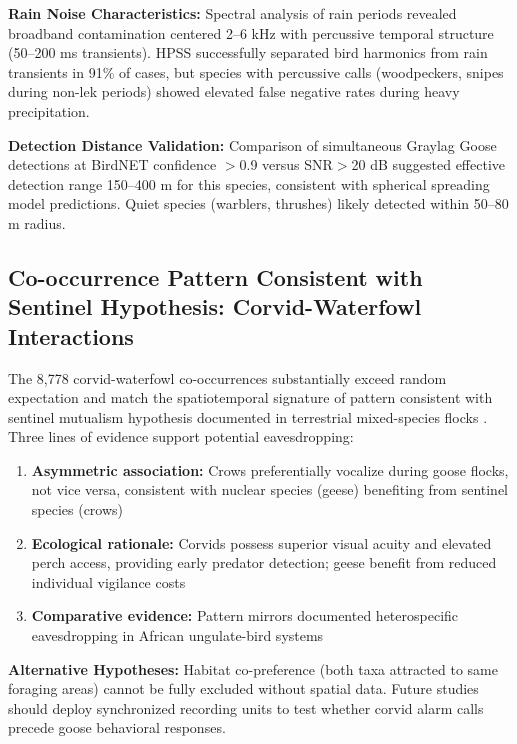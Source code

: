 \documentclass[twocolumn]{article}
\begin{document}
\textbf{Rain Noise Characteristics:} Spectral analysis of rain periods revealed broadband contamination centered 2--6 kHz with percussive temporal structure (50--200 ms transients). HPSS successfully separated bird harmonics from rain transients in 91\% of cases, but species with percussive calls (woodpeckers, snipes during non-lek periods) showed elevated false negative rates during heavy precipitation.

\textbf{Detection Distance Validation:} Comparison of simultaneous Graylag Goose detections at BirdNET confidence $>$0.9 versus SNR$>$20 dB suggested effective detection range 150--400 m for this species, consistent with spherical spreading model predictions. Quiet species (warblers, thrushes) likely detected within 50--80 m radius.

\subsection{Co-occurrence Pattern Consistent with Sentinel Hypothesis: Corvid-Waterfowl Interactions}

The 8,778 corvid-waterfowl co-occurrences substantially exceed random expectation and match the spatiotemporal signature of pattern consistent with sentinel mutualism hypothesis documented in terrestrial mixed-species flocks \citep{Magrath2015}. Three lines of evidence support potential eavesdropping:

\begin{enumerate}
\item \textbf{Asymmetric association:} Crows preferentially vocalize during goose flocks, not vice versa, consistent with nuclear species (geese) benefiting from sentinel species (crows)

\item \textbf{Ecological rationale:} Corvids possess superior visual acuity and elevated perch access, providing early predator detection; geese benefit from reduced individual vigilance costs \citep{King2023}

\item \textbf{Comparative evidence:} Pattern mirrors documented heterospecific eavesdropping in African ungulate-bird systems \citep{Ridley2007}
\end{enumerate}

\textbf{Alternative Hypotheses:} Habitat co-preference (both taxa attracted to same foraging areas) cannot be fully excluded without spatial data. Future studies should deploy synchronized recording units to test whether corvid alarm calls precede goose behavioral responses.
\end{document}
